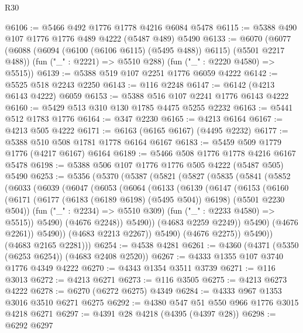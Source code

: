 \begin{lexlean}{R30}
\begin{coremodule}
@6106 := @5466 @492 @1776 @1778 @4216 @6084 @5478
@6115 := @5388 @490 @107 @1776 @1776 @489 @4222 (@5487 @489) @5490
@6133 := @6070
    (@6077
      (@6088 (@6094 (@6100 (@6106 @6115) (@5495 @488)) @6115) (@5501 @2217 @488))
      (fun ("_" : @2221) => @5510 @288)
      (fun ("_" : @2220 @4580) => @5515))
@6139 := @5388 @519 @107 @2251 @1776 @6059 @4222
@6142 := @5525 @518 @2243 @2250
@6143 := @116 @2248
@6147 := @6142 (@4213 @6143 @4222) @6059
@6153 := @5388 @516 @107 @2241 @1776 @6143 @4222
@6160 := @5429 @513 @310 @130 @1785 @4475 @5255 @2232
@6163 := @5441 @512 @1783 @1776
@6164 := @347 @2230
@6165 := @4213 @6164
@6167 := @4213 @505 @4222
@6171 := @6163 (@6165 @6167) (@4495 @2232)
@6177 := @5388 @510 @508 @1781 @1778 @6164 @6167
@6183 := @5459 @509 @1779 @1776 (@4217 @6167) @6164
@6189 := @5466 @508 @1776 @1778 @4216 @6167 @5478
@6198 := @5388 @506 @107 @1776 @1776 @505 @4222 (@5487 @505) @5490
@6253 := @5356
    (@5370
      (@5387
        (@5821
          (@5827
            (@5835
              (@5841
                (@5852
                  (@6033
                    (@6039
                      (@6047
                        (@6053
                          (@6064
                            (@6133
                              (@6139
                                (@6147
                                  (@6153
                                    (@6160
                                      (@6171
                                        (@6177 (@6183 (@6189 @6198) (@5495 @504)) @6198)
                                        (@5501 @2230 @504))
                                      (fun ("_" : @2234) => @5510 @309)
                                      (fun ("_" : @2233 @4580) => @5515))
                                    @5490)
                                  (@4676 @2248))
                                @5490))
                            (@4683 @2259 @2249))
                          @5490)
                        (@4676 @2261))
                      @5490))
                  (@4683 @2213 @2267))
                @5490)
              (@4676 @2275))
            @5490))
        (@4683 @2165 @2281)))
@6254 := @4538 @4281
@6261 := @4360 (@4371 (@5350 (@6253 @6254)) (@4683 @2408 @2520))
@6267 := @4333 @1355 @107 @3740 @1776 @4349 @4222
@6270 := @4343 @1354 @3511 @3739
@6271 := @116 @3013
@6272 := @4213 @6271
@6273 := @116 @3505
@6275 := @4213 @6273 @4222
@6278 := @6270 (@6272 @6275) @4349
@6284 := @4333 @967 @1353 @3016 @3510 @6271 @6275
@6292 := @4380 @547 @51 @550 @966 @1776 @3015 @4218 @6271
@6297 := @4391 @28 @4218 (@4395 (@4397 @28))
@6298 := @6292 @6297

\end{coremodule}
\end{lexlean}
